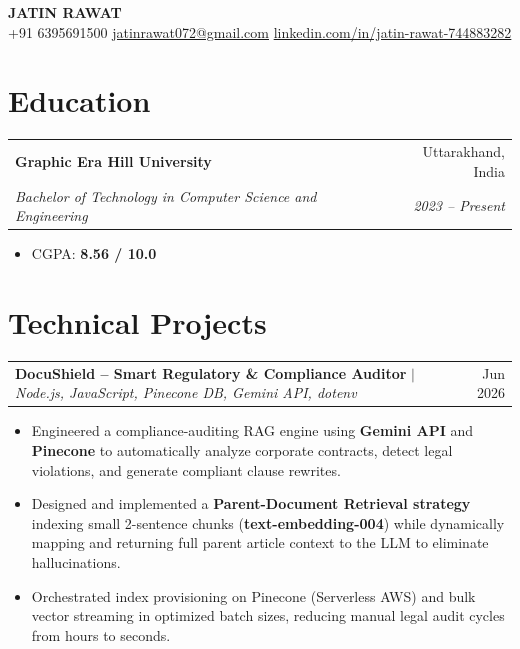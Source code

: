 \documentclass[letterpaper,11pt]{article}
\makeatletter
\newcommand{\resumeItem}[1]{\item\small{#1}}
\newcommand{\resumeSubheading}[4]{
  \vspace{-1pt}
  \begin{tabular*}{\textwidth}[t]{l@{\extracolsep{\fill}}r}
    \textbf{#1} & #2 \\
    \textit{\small#3} & \textit{\small #4} \\
  \end{tabular*}\vspace{-4pt}
}
\newcommand{\resumeProjectHeading}[3]{
  \vspace{2pt}
  \begin{tabular*}{\textwidth}{@{}p{0.78\textwidth}@{\extracolsep{\fill}}r@{}}
    \textbf{#1} $|$ \small\textit{#2} & \small #3
  \end{tabular*}\vspace{-3pt}
}
\makeatother
\begin{document}
\begin{center}
  {\LARGE \textbf{JATIN RAWAT}} \\[5pt]
  \small
  +91 6395691500 \quad
  \href{mailto:jatinrawat072@gmail.com}{jatinrawat072@gmail.com} \quad
  \href{https://www.linkedin.com/in/jatin-rawat-744883282/}{linkedin.com/in/jatin-rawat-744883282}
\end{center}

\vspace{-10pt}

\section{Education}
\resumeSubheading
  {Graphic Era Hill University}{Uttarakhand, India}
  {Bachelor of Technology in Computer Science and Engineering}{2023 -- Present}
\begin{itemize}
  \resumeItem{CGPA: \textbf{8.56 / 10.0}}
\end{itemize}

\section{Technical Projects}

\resumeProjectHeading
  {DocuShield -- Smart Regulatory \& Compliance Auditor}
  {Node.js, JavaScript, Pinecone DB, Gemini API, dotenv}
  {Jun 2026}
\begin{itemize}
  \resumeItem{Engineered a compliance-auditing RAG engine using \textbf{Gemini API} and \textbf{Pinecone} to automatically analyze corporate contracts, detect legal violations, and generate compliant clause rewrites.}
  \resumeItem{Designed and implemented a \textbf{Parent-Document Retrieval strategy} indexing small 2-sentence chunks (\textbf{text-embedding-004}) while dynamically mapping and returning full parent article context to the LLM to eliminate hallucinations.}
  \resumeItem{Orchestrated index provisioning on Pinecone (Serverless AWS) and bulk vector streaming in optimized batch sizes, reducing manual legal audit cycles from hours to seconds.}
\end{itemize}

\vspace{2pt}
\end{document}
